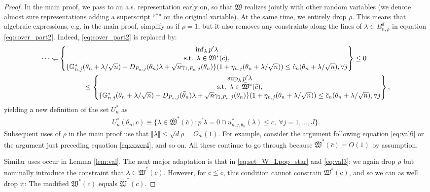 \documentclass[letterpaper,11pt]{article}
\theoremstyle{myplain}
\theoremstyle{mydefinition}
\theoremstyle{myremark}
\newcommand{\cP}{\mathcal{P}}
\numberwithin{equation}{section}
\numberwithin{figure}{section}
\begin{document}
\begin{appendices}
\begin{proof}
In the main proof, we pass to an a.s. representation early on, so that $\mathfrak{W}$ realizes jointly with other random variables (we denote almost sure representations adding a superscript ``$^*$" on the original variable). At the same time, we entirely drop $\rho$. This means that algebraic expressions, e.g. in the main proof, simplify as if $\rho=1$, but it also removes any constraints along the lines of $\lambda \in B^d_{n,\rho}$ in equation \eqref{eq:cover_part2}. Indeed, \eqref{eq:cover_part2} is replaced by: 
\begin{align*}
\dots \Leftarrow	 &\begin{Bmatrix} \inf_{\lambda} p^\prime\lambda     \\ \text{s.t. } \lambda\in \bar{\mathfrak{W}}^*(\bar{c}),  \\ \{\mathbb G^*_{n,j}(\theta_n+\lambda/\sqrt{n})+D_{P_n,j}(\bar\theta_n)\lambda+\sqrt{n} \gamma_{1,P_n,j}(\theta_n)\}(1+\eta_{n,j}(\theta_n+\lambda/\sqrt{n}))\le  \hat{c}_n(\theta_n+\lambda/\sqrt{n}), \forall j    \end{Bmatrix} \leq 0 \\
	 &\hspace{0.5in}\leq\begin{Bmatrix} \sup_{\lambda} p'\lambda    \\ \text{s.t. } \lambda\in \bar{\mathfrak{W}}^*(\bar{c}),  \\ \{\mathbb G^*_{n,j}(\theta_n+\lambda/\sqrt{n})+ D_{P_n,j}(\bar\theta_n)\lambda+\sqrt{n} \gamma_{1,P_n,j}(\theta_n)\}(1+\eta_{n,j}(\theta_n+\lambda/\sqrt{n}))\le  \hat{c}_n(\theta_n+\lambda/\sqrt{n}), \forall j    \end{Bmatrix},
	 \end{align*}
yielding a new definition of the set $U_n^*$ as
\begin{align*}
U_n^*(\theta_n,c)\equiv	\big\{\lambda\in \bar{\mathfrak{W}}^*(\bar{c}): p^\prime \lambda = 0 \cap u^*_{n,j,\theta_n}(\lambda)\le c, \: \forall j=1,\dots,J\big\}.
\end{align*}
Subsequent uses of $\rho$ in the main proof use that $\Vert \lambda \Vert \leq \sqrt{d}\rho=O_\cP(1)$. For example, consider the argument following equation \eqref{eq:val6} or the argument just preceding equation \eqref{eq:cover4}, and so on. All these continue to go through because $\bar{\mathfrak{W}}^*(\bar{c})=O(1)$ by assumption.

Similar uses occur in Lemma \ref{lem:val}. The next major adaptation is that in \eqref{eq:set_W_Lpop_star} and \eqref{eq:val3}: we again drop $\rho$ but nominally introduce the constraint that $\lambda \in \bar{\mathfrak{W}}^*(\bar{c})$. However, for $c \leq \bar{c}$, this condition cannot constrain $\mathfrak{W}^*(c)$, and so we can as well drop it: The modified $\mathfrak{W}^*(c)$ equals $\bar{\mathfrak{W}}^*(c)$.


\end{proof}
\end{appendices}
\end{document}

